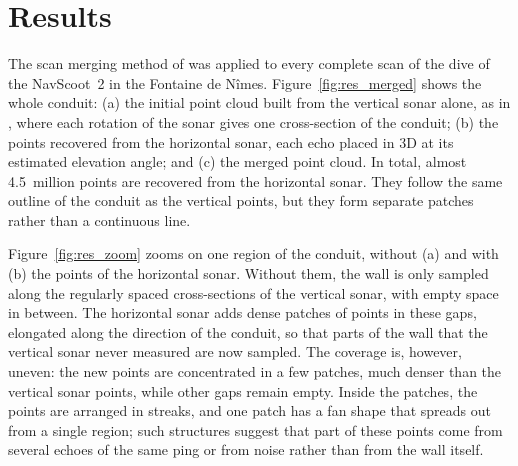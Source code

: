 \section{Results}                        %
\label{sec:results}                      %

The scan merging method of  was applied to every complete scan of the dive
of the NavScoot~2 in the Fontaine de N\^imes. Figure~\ref{fig:res_merged} shows the whole conduit:
(a) the initial point cloud built from the vertical sonar alone, as in
\citet{margaritis2025internship}, where each rotation of the sonar gives one cross-section of the
conduit; (b) the points recovered from the horizontal sonar, each echo placed in 3D at its estimated
elevation angle; and (c) the merged point cloud. In total, almost 4.5~million points are recovered
from the horizontal sonar. They follow the same outline of the conduit as the vertical points, but
they form separate patches rather than a continuous line.

Figure~\ref{fig:res_zoom} zooms on one region of the conduit, without (a) and with (b) the points of
the horizontal sonar. Without them, the wall is only sampled along the regularly spaced cross-sections
of the vertical sonar, with empty space in between. The horizontal sonar adds dense patches of points
in these gaps, elongated along the direction of the conduit, so that parts of the wall that the
vertical sonar never measured are now sampled. The coverage is, however, uneven: the new points are
concentrated in a few patches, much denser than the vertical sonar points, while other gaps remain
empty. Inside the patches, the points are arranged in streaks, and one patch has a fan shape that
spreads out from a single region; such structures suggest that part of these points come from
several echoes of the same ping or from noise rather than from the wall itself.

